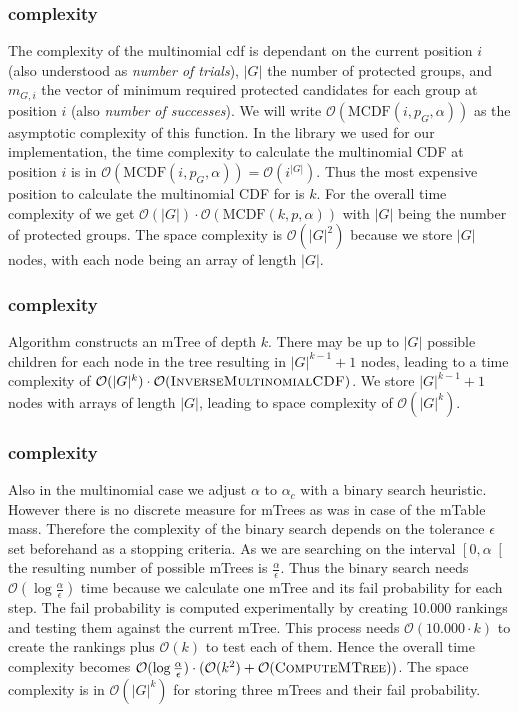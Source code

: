 \subsubsection{\algoImcdf complexity}\label{subsubsec:imcdf-complexity}
The complexity of the multinomial cdf is dependant on the current position $i$ (also understood as \textit{number of trials}), $|G|$ the number of protected groups, and $m_{G,i}$ the vector of minimum required protected candidates for each group at position $i$ (also \textit{number of successes}).
%
We will write $\mathcal{O}(\text{MCDF}(i,p_G,\alpha))$ as the asymptotic complexity of this function. 
%
In the library we used for our implementation, the time complexity to calculate the multinomial CDF at position $i$ is in $\mathcal{O}(\text{MCDF}(i,p_G,\alpha)) = \mathcal{O}(i^{|G|})$. 
%
Thus the most expensive position to calculate the multinomial CDF for is $k$.
%
For the overall time complexity of \algoImcdf we get $\mathcal{O}(|G|) \cdot \mathcal{O}(\text{MCDF}(k,p,\alpha ))$ with $|G|$ being the number of protected groups.
%
The space complexity is $\mathcal{O}(|G|^2)$ because we store $|G|$ nodes, with each node being an array of length $|G|$.
%
\subsubsection{\algoComputeMTree complexity}\label{subsubsec:mtree-complexity}
Algorithm \algoComputeMTree constructs an mTree of depth $k$.
%
There may be up to $|G|$ possible children for each node in the tree resulting in $|G|^{k-1} +1$ nodes, leading to a time complexity of $\mathcal{O}(|G|^{k}) \cdot \mathcal{O}(\text{{\sc InverseMultinomialCDF}})$.
%
We store $|G|^{k-1} +1$ nodes with arrays of length $|G|$, leading to space complexity of $\mathcal{O}(|G|^{k})$.
%
\subsubsection{\algoMultBinary complexity}\label{subsubsec:multBinary-complexity}
Also in the multinomial case we adjust $\alpha$ to $\alpha_c$ with a binary search heuristic.
%
However there is no discrete measure for mTrees as was in case of the mTable mass.
%
Therefore the complexity of the binary search depends on the tolerance $\epsilon$ set beforehand as a stopping criteria.
%
As we are searching on the interval $\left[0,\alpha\right[$ the resulting number of possible mTrees is $\frac{\alpha}{\epsilon}$.
%
Thus the binary search needs $\mathcal{O}(\log{}\frac{\alpha}{\epsilon})$ time because we calculate one mTree and its fail probability for each step.
%
The fail probability is computed experimentally by creating 10.000 rankings and testing them against the current mTree.
%
This process needs $\mathcal{O}(10.000 \cdot k)$ to create the rankings plus $\mathcal{O}(k)$ to test each of them.
%
Hence the overall time complexity becomes $\mathcal{O}(\log{}\frac{\alpha}{\epsilon}) \cdot (\mathcal{O}(k^2) + \mathcal{O}(\text{{\sc ComputeMTree}}))$.
%
The space complexity is in $\mathcal{O}(|G|^k)$ for storing three mTrees and their fail probability.
%
